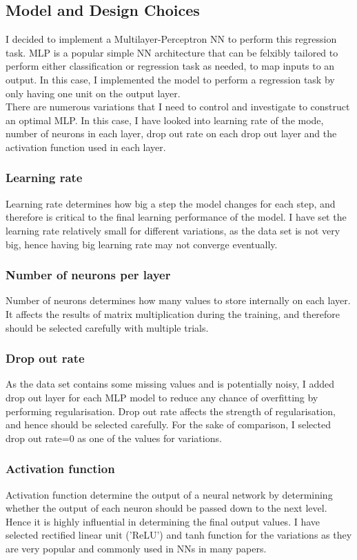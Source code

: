 \documentclass[letterpaper, 12 pt, conference]{ieeeconf}  %
\begin{document}
\subsection{Model and Design Choices}
I decided to implement a Multilayer-Perceptron NN to perform this regression task. MLP is a popular simple NN architecture that can be felxibly tailored to perform either classification or regression task as needed, to map inputs to an output. In this case, I implemented the model to perform a regression task by only having one unit on the output layer. \\\newline
There are numerous variations that I need to control and investigate to construct an optimal MLP. In this case, I have looked into learning rate of the mode, number of neurons in each layer, drop out rate on each drop out layer and the activation function used in each layer.
\\
\subsubsection{Learning rate}
Learning rate determines how big a step the model changes for each step, and therefore is critical to the final learning performance of the model. I have set the learning rate relatively small for different variations, as the data set is not very big, hence having big learning rate may not converge eventually. 
\\
\subsubsection{Number of neurons per layer}
Number of neurons determines how many values to store internally on each layer. It affects the results of matrix multiplication during the training, and therefore should be selected carefully with multiple trials.
\\
\subsubsection{Drop out rate}
As the data set contains some missing values and is potentially noisy, I added drop out layer for each MLP model to reduce any chance of overfitting by performing regularisation. Drop out rate affects the strength of regularisation, and hence should be selected carefully. For the sake of comparison, I selected drop out rate=0 as one of the values for variations.
\\
\subsubsection{Activation function}
Activation function determine the output of a neural network by determining whether the output of each neuron should be passed down to the next level. Hence it is highly influential in determining the final output values. I have selected  rectified linear unit ('ReLU') and tanh function for the variations as they are very popular and commonly used in NNs in many papers.\\
\end{document}
